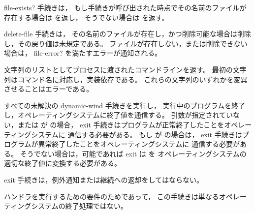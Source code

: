 \begin{entry}{%
}

{\cf file-exists?} 手続きは，
もし手続きが呼び出された時点でその名前のファイルが存在する場合は \schtrue{} を返し，
そうでない場合は \schfalse{} を返す。

\end{entry}

\begin{entry}{%
}

{\cf delete-file} 手続きは，
その名前のファイルが存在し，かつ削除可能な場合は削除し，その戻り値は未規定である。
ファイルが存在しない，または削除できない場合は，
{\cf file-error?} を満たすエラーが通知される。

\end{entry}

\begin{entry}{%
}

文字列のリストとしてプロセスに渡されたコマンドラインを返す。
最初の文字列はコマンド名に対応し，実装依存である。
これらの文字列のいずれかを変異させることはエラーである。
\end{entry}

\begin{entry}{%
}

すべての未解決の dynamic-wind  手続きを実行し，
実行中のプログラムを終了し，オペレーティングシステムに終了値を通信する。
引数が指定されていない，または  が \schtrue{} の場合，
{\cf exit} 手続きはプログラムが正常終了したことをオペレーティングシステムに
通信する必要がある。
もし  が \schfalse{} の場合は，
{\cf exit} 手続きはプログラムが異常終了したことをオペレーティングシステムに
通信する必要がある。
そうでない場合は，可能であれば {\cf exit} は  を
オペレーティングシステムの適切な終了値に変換する必要がある。

{\cf exit} 手続きは，例外通知または継続への返却をしてはならない。

\begin{note}
ハンドラを実行するための要件のためであって，
この手続きは単なるオペレーティングシステムの終了処理ではない。
\end{note}

\end{entry}

